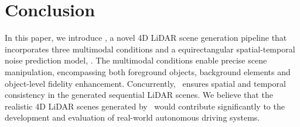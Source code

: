 \section{Conclusion}

In this paper, we introduce \sysname, a novel 4D LiDAR scene generation pipeline that incorporates three multimodal conditions and a equirectangular spatial-temporal noise prediction model, \modelname. The multimodal conditions enable precise scene manipulation, encompassing both foreground objects, background elements and object-level fidelity enhancement. Concurrently, \modelname\ ensures spatial and temporal consistency in the generated sequential LiDAR scenes.
We believe that the realistic 4D LiDAR scenes generated by \sysname\ would contribute significantly to the development and evaluation of real-world autonomous driving systems.